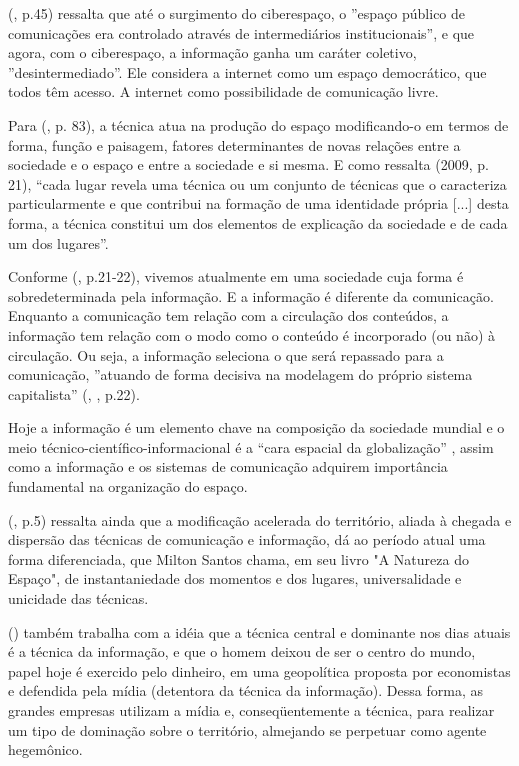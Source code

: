 \documentclass[
	article,			%
	12pt,				%
	oneside,			%
	a4paper,			%
	english,			%
	brazil,				%
	]{abntex2}
\begin{document}
 (\citeyear{levy1998}, p.45) ressalta que até o surgimento do ciberespaço, o ''espaço público de comunicações era controlado através de intermediários institucionais'', e que agora, com o ciberespaço, a informação ganha um caráter coletivo, ''desintermediado''. Ele considera a internet como um espaço democrático, que todos têm acesso. A internet como possibilidade de comunicação livre.

Para  (\citeyear{santos1996}, p. 83), a técnica atua na produção do espaço modificando-o em termos de forma, função e paisagem, fatores determinantes de novas relações entre a sociedade e o espaço e entre a sociedade e si mesma. E como ressalta  (2009, p. 21), “cada lugar revela uma técnica ou um conjunto de técnicas que o caracteriza particularmente e que contribui na formação de uma identidade própria [...] desta forma, a técnica constitui um dos elementos de explicação da sociedade e de cada um dos lugares”.

Conforme  (\citeyear{cohn2001}, p.21-22), vivemos atualmente em uma sociedade cuja forma é sobredeterminada pela informação. E a informação é diferente da comunicação. Enquanto a comunicação tem relação com a circulação dos conteúdos, a informação tem relação com o modo como o conteúdo é incorporado (ou não) à circulação. Ou seja, a informação seleciona o que será repassado para a comunicação, ''atuando de forma decisiva na modelagem do próprio sistema capitalista'' (\citeauthor{cohn2001}, \citeyear{cohn2001}, p.22).

Hoje a informação é um elemento chave na composição da sociedade mundial e o meio técnico-científico-informacional é a “cara espacial da globalização” \cite{santos1996}, assim como a informação e os sistemas de comunicação adquirem importância fundamental na organização do espaço.

 (\citeyear{maia}, p.5) ressalta ainda que a modificação acelerada do território, aliada à chegada e dispersão das técnicas de comunicação e informação, dá ao período atual uma forma diferenciada, que Milton Santos chama, em seu livro "A Natureza do Espaço", de instantaniedade dos momentos e dos lugares, universalidade e unicidade das técnicas.

 (\citeyear{santos2001}) também trabalha com a idéia que a técnica central e dominante nos dias atuais é a técnica da informação, e que o homem deixou de ser o centro do mundo, papel hoje é exercido pelo dinheiro, em uma geopolítica proposta por economistas e defendida pela mídia (detentora da técnica da informação). Dessa forma, as grandes empresas utilizam a mídia e, conseqüentemente a técnica, para realizar um tipo de dominação sobre o território, almejando se perpetuar como agente hegemônico.
\end{document}
